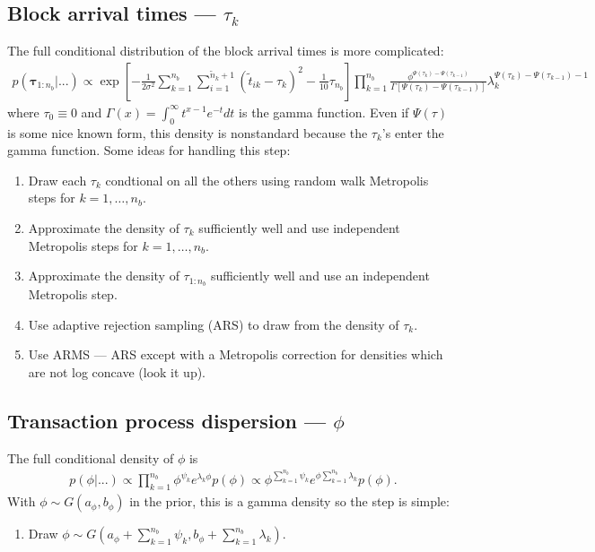 \documentclass{article}
\begin{document}
\subsection{Block arrival times --- $\tau_k$}
The full conditional distribution of the block arrival times is more complicated:
\begin{align*}
p(\bm{\tau}_{1:n_{b}}|...) \propto \exp\left[-\frac{1}{2\sigma^2}\sum_{k=1}^{n_{b}}\sum_{i=1}^{\tilde{n}_k+1}\left(\tilde{t}_{ik} - \tau_k\right)^2 - \frac{1}{10}\tau_{n_{b}}\right]\prod_{k=1}^{n_b}\frac{\phi^{\Psi(\tau_k) - \Psi(\tau_{k-1})}}{\Gamma\left[\Psi(\tau_k) - \Psi(\tau_{k-1})\right]}\lambda_k^{\Psi(\tau_k)-\Psi(\tau_{k-1}) - 1}
\end{align*}
where $\tau_0\equiv0$ and $\Gamma(x) = \int_0^\infty t^{x-1}e^{-t}dt$ is the gamma function. Even if $\Psi(\tau)$ is some nice known form, this density is nonstandard because the $\tau_k$'s enter the gamma function. Some ideas for handling this step:
\begin{enumerate}
\item Draw each $\tau_k$ condtional on all the others using random walk Metropolis steps for $k=1,\dots,n_{b}$.
\item Approximate the density of $\tau_k$ sufficiently well and use independent Metropolis steps for $k=1,\dots,n_{b}$.
\item Approximate the density of $\tau_{1:n_{b}}$ sufficiently well and use an independent Metropolis step.
\item Use adaptive rejection sampling (ARS) to draw from the density of $\tau_k$.
\item Use ARMS --- ARS except with a Metropolis correction for densities which are not log concave (look it up).
\end{enumerate}

\subsection{Transaction process dispersion --- $\phi$}
The full conditional density of $\phi$ is
\begin{align*}
p(\phi|...) \propto \prod_{k=1}^{n_{b}}\phi^{\psi_k}e^{\lambda_k\phi}p(\phi) \propto \phi^{\sum_{k=1}^{n_{b}}\psi_k}e^{\phi\sum_{k=1}^{n_{b}}\lambda_k}p(\phi).
\end{align*}
With $\phi \sim G(a_\phi, b_\phi)$ in the prior, this is a gamma density so the step is simple:
\begin{enumerate}
\item Draw $\phi \sim G\left(a_\phi + \sum_{k=1}^{n_{b}}\psi_k, b_{\phi} + \sum_{k=1}^{n_{b}}\lambda_k \right)$.
\end{enumerate}
\end{document}
